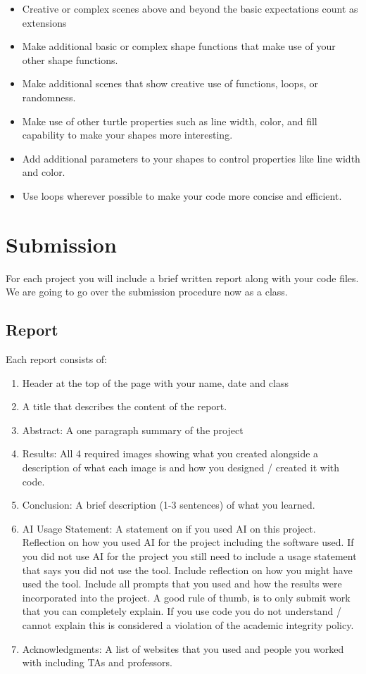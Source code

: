 \documentclass[12pt]{article}
\begin{document}
\begin{itemize}
\item Creative or complex scenes above and beyond the basic expectations count as extensions
\item Make additional basic or complex shape functions that make use of your other shape functions.
\item Make additional scenes that show creative use of functions, loops, or randomness.
\item Make use of other turtle properties such as line width, color, and fill capability to make your shapes more interesting.
\item Add additional parameters to your shapes to control properties like line width and color.
\item Use loops wherever possible to make your code more concise and efficient.
\end{itemize}

\section{Submission}
For each project you will include a brief written report along with your code files.
We are going to go over the submission procedure now as a class. 

\subsection{Report}
Each report consists of:
\begin{enumerate}
\item Header at the top of the page with your name, date and class
\item A title that describes the content of the report. 
\item Abstract: A one paragraph summary of the project
\item Results: All 4 required images showing what you created alongside a description of what each image is and how you designed / created it with code.
\item Conclusion: A brief description (1-3 sentences) of what you learned.
\item AI Usage Statement: A statement on if you used AI on this project. Reflection on how you used AI for the project including the software used. If you did not use AI for the project you still need to include a usage statement that says you did not use the tool. Include reflection on how you might have used the tool. Include all prompts that you used and how the results were incorporated into the project. A good rule of thumb, is to only submit work that you can completely explain. If you use code you do not understand / cannot explain this is considered a violation of the academic integrity policy.
\item Acknowledgments: A list of websites that you used and people you worked with including TAs and professors.
\end{enumerate}
\end{document}

